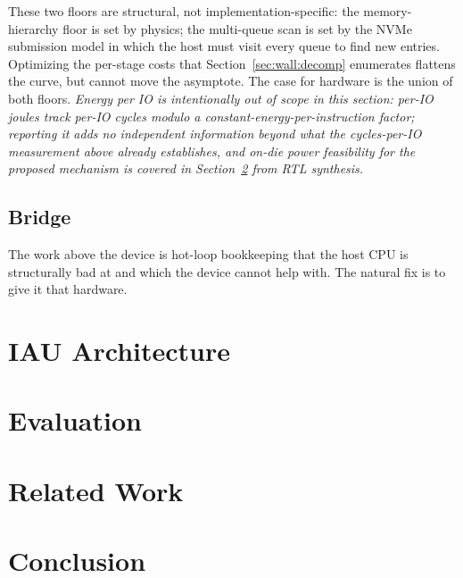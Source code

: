 \documentclass[journal]{IEEEtran}
\begin{document}
These two floors are structural, not implementation-specific: the
memory-hierarchy floor is set by physics; the multi-queue scan is set
by the NVMe submission model in which the host must visit every queue
to find new entries. Optimizing the per-stage costs that
Section~\ref{sec:wall:decomp} enumerates flattens the curve, but cannot
move the asymptote. The case for hardware is the union of both floors.
\emph{Energy per IO is intentionally out of scope in this section:
per-IO joules track per-IO cycles modulo a constant-energy-per-instruction
factor; reporting it adds no independent information beyond what the
cycles-per-IO measurement above already establishes, and on-die power
feasibility for the proposed mechanism is covered in
Section~\ref{sec:eval} from RTL synthesis.}

\subsection{Bridge}
\label{sec:wall:bridge}

The work above the device is hot-loop bookkeeping that the host CPU is
structurally bad at and which the device cannot help with. The natural
fix is to give it that hardware.

%
\section{IAU Architecture}
\label{sec:arch}

\section{Evaluation}
\label{sec:eval}

\section{Related Work}
\label{sec:related}

\section{Conclusion}
\label{sec:conclusion}



\end{document}
